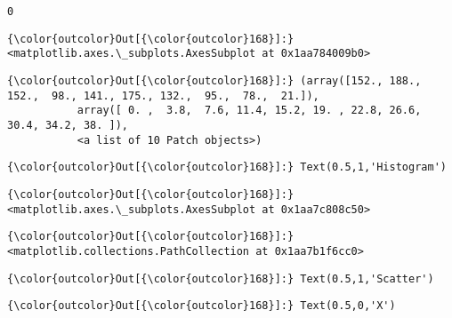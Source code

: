 \documentclass[11pt]{article}
\begin{document}
    \begin{Verbatim}[commandchars=\\\{\}]
0

    \end{Verbatim}

\begin{Verbatim}[commandchars=\\\{\}]
{\color{outcolor}Out[{\color{outcolor}168}]:} <matplotlib.axes.\_subplots.AxesSubplot at 0x1aa784009b0>
\end{Verbatim}
            
\begin{Verbatim}[commandchars=\\\{\}]
{\color{outcolor}Out[{\color{outcolor}168}]:} (array([152., 188., 152.,  98., 141., 175., 132.,  95.,  78.,  21.]),
           array([ 0. ,  3.8,  7.6, 11.4, 15.2, 19. , 22.8, 26.6, 30.4, 34.2, 38. ]),
           <a list of 10 Patch objects>)
\end{Verbatim}
            
\begin{Verbatim}[commandchars=\\\{\}]
{\color{outcolor}Out[{\color{outcolor}168}]:} Text(0.5,1,'Histogram')
\end{Verbatim}
            
\begin{Verbatim}[commandchars=\\\{\}]
{\color{outcolor}Out[{\color{outcolor}168}]:} <matplotlib.axes.\_subplots.AxesSubplot at 0x1aa7c808c50>
\end{Verbatim}
            
\begin{Verbatim}[commandchars=\\\{\}]
{\color{outcolor}Out[{\color{outcolor}168}]:} <matplotlib.collections.PathCollection at 0x1aa7b1f6cc0>
\end{Verbatim}
            
\begin{Verbatim}[commandchars=\\\{\}]
{\color{outcolor}Out[{\color{outcolor}168}]:} Text(0.5,1,'Scatter')
\end{Verbatim}
            
\begin{Verbatim}[commandchars=\\\{\}]
{\color{outcolor}Out[{\color{outcolor}168}]:} Text(0.5,0,'X')
\end{Verbatim}
            
\end{document}
